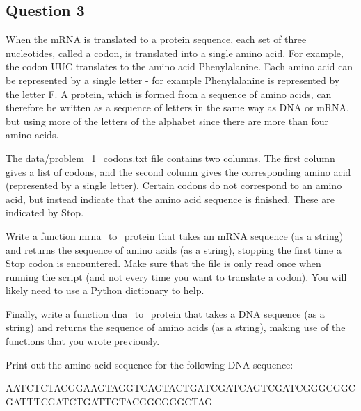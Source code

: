 \documentclass[11pt]{article}
\begin{document}
\subsection{Question 3}\label{question-3}

When the mRNA is translated to a protein sequence, each set of three
nucleotides, called a codon, is translated into a single amino acid. For
example, the codon UUC translates to the amino acid Phenylalanine. Each
amino acid can be represented by a single letter - for example
Phenylalanine is represented by the letter F. A protein, which is formed
from a sequence of amino acids, can therefore be written as a sequence
of letters in the same way as DNA or mRNA, but using more of the letters
of the alphabet since there are more than four amino acids.

The data/problem\_1\_codons.txt file contains two columns. The first
column gives a list of codons, and the second column gives the
corresponding amino acid (represented by a single letter). Certain
codons do not correspond to an amino acid, but instead indicate that the
amino acid sequence is finished. These are indicated by Stop.

Write a function mrna\_to\_protein that takes an mRNA sequence (as a
string) and returns the sequence of amino acids (as a string), stopping
the first time a Stop codon is encountered. Make sure that the file is
only read once when running the script (and not every time you want to
translate a codon). You will likely need to use a Python dictionary to
help.

Finally, write a function dna\_to\_protein that takes a DNA sequence (as
a string) and returns the sequence of amino acids (as a string), making
use of the functions that you wrote previously.

Print out the amino acid sequence for the following DNA sequence:

AATCTCTACGGAAGTAGGTCAGTACTGATCGATCAGTCGATCGGGCGGCGATTTCGATCTGATTGTACGGCGGGCTAG
\end{document}
